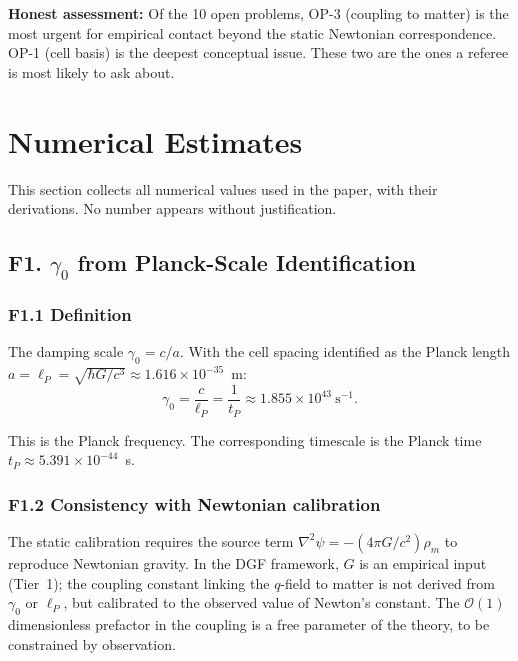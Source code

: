 \documentclass[reprint]{revtex4-2}
\begin{document}
\textbf{Honest assessment:} Of the 10 open problems, OP-3 (coupling to matter) is the most urgent for empirical contact beyond the static Newtonian correspondence. OP-1 (cell basis) is the deepest conceptual issue. These two are the ones a referee is most likely to ask about.

\section{Numerical Estimates}

This section collects all numerical values used in the paper, with their derivations. No number appears without justification.

\subsection{F1. $\gamma_0$ from Planck-Scale Identification}

\subsubsection{F1.1 Definition}

The damping scale $\gamma_0 = c/a$. With the cell spacing identified as the Planck length $a = \ell_P = \sqrt{\hbar G/c^3} \approx 1.616\times 10^{-35}$~m:
\begin{equation}
\boxed{\gamma_0 = \frac{c}{\ell_P} = \frac{1}{t_P} \approx 1.855\times 10^{43}~\text{s}^{-1}}.
\label{eq:gamma0_value}
\end{equation}

This is the Planck frequency. The corresponding timescale is the Planck time $t_P \approx 5.391\times 10^{-44}$~s.

\subsubsection{F1.2 Consistency with Newtonian calibration}

The static calibration requires the source term $\nabla^2\psi = -(4\pi G/c^2)\rho_m$ to reproduce Newtonian gravity. In the DGF framework, $G$ is an empirical input (Tier~1); the coupling constant linking the $q$-field to matter is not derived from $\gamma_0$ or $\ell_P$, but calibrated to the observed value of Newton's constant. The $\mathcal{O}(1)$ dimensionless prefactor in the coupling is a free parameter of the theory, to be constrained by observation.
\end{document}

